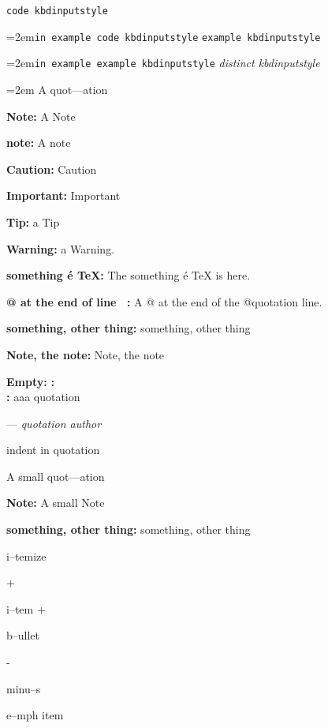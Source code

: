 \documentclass{book}
\begin{document}
\endgroup{}
\texttt{code kbdinputstyle}
\par\begingroup\obeylines\obeyspaces\frenchspacing\leftskip=2em\relax\parskip=0pt\relax\ttfamily{}\texttt{in example code kbdinputstyle}
\endgroup{}
\texttt{example kbdinputstyle}
\par\begingroup\obeylines\obeyspaces\frenchspacing\leftskip=2em\relax\parskip=0pt\relax\ttfamily{}\texttt{in example example kbdinputstyle}
\endgroup{}
{\ttfamily\textsl{distinct kbdinputstyle}}
\par\begingroup\obeylines\obeyspaces\frenchspacing\leftskip=2em\relax\parskip=0pt\relax{}
\endgroup{}
A quot---ation

\textbf{Note:} A Note

\textbf{note:} A note

\textbf{Caution:} Caution

\textbf{Important:} Important

\textbf{Tip:} a Tip

\textbf{Warning:} a Warning.

\textbf{something \'{e} \TeX{}:} The something \'{e} \TeX{} is here.

\textbf{@ at the end of line \ {}:} A @ at the end of the @quotation line.

\textbf{something, other thing:} something, other thing

\textbf{Note, the note:} Note, the note


\textbf{Empty:} 
\textbf{:} 
\textbf{\leavevmode{}\\:} 
aaa quotation
\begin{center}
--- \emph{quotation author}
\end{center}

indent in quotation

A small quot---ation

\textbf{Note:} A small Note

\textbf{something, other thing:} something, other thing

\textbullet{} 

i--temize

+ 

i--tem +

\textbullet{} 

b--ullet

- 

minu--s

\emph{} 

e--mph item
\end{document}
